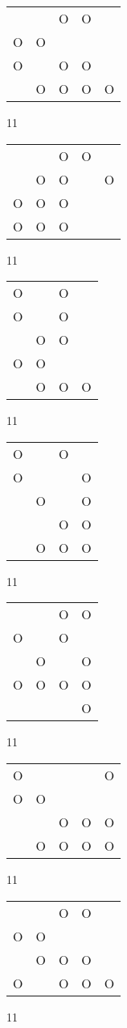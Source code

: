 \begin{tabular}{|m{0.2cm}m{0.2cm}m{0.2cm}m{0.2cm}m{0.2cm}|}\hline
 & &O&O& \\
O&O& & & \\
O& &O&O& \\
 &O&O&O&O\\
\hline\end{tabular}11
\begin{tabular}{|m{0.2cm}m{0.2cm}m{0.2cm}m{0.2cm}m{0.2cm}|}\hline
 & &O&O& \\
 &O&O& &O\\
O&O&O& & \\
O&O&O& & \\
\hline\end{tabular}11
\begin{tabular}{|m{0.2cm}m{0.2cm}m{0.2cm}m{0.2cm}|}\hline
O& &O& \\
O& &O& \\
 &O&O& \\
O&O& & \\
 &O&O&O\\
\hline\end{tabular}11
\begin{tabular}{|m{0.2cm}m{0.2cm}m{0.2cm}m{0.2cm}|}\hline
O& &O& \\
O& & &O\\
 &O& &O\\
 & &O&O\\
 &O&O&O\\
\hline\end{tabular}11
\begin{tabular}{|m{0.2cm}m{0.2cm}m{0.2cm}m{0.2cm}|}\hline
 & &O&O\\
O& &O& \\
 &O& &O\\
O&O&O&O\\
 & & &O\\
\hline\end{tabular}11
\begin{tabular}{|m{0.2cm}m{0.2cm}m{0.2cm}m{0.2cm}m{0.2cm}|}\hline
O& & & &O\\
O&O& & & \\
 & &O&O&O\\
 &O&O&O&O\\
\hline\end{tabular}11
\begin{tabular}{|m{0.2cm}m{0.2cm}m{0.2cm}m{0.2cm}m{0.2cm}|}\hline
 & &O&O& \\
O&O& & & \\
 &O&O&O& \\
O& &O&O&O\\
\hline\end{tabular}11
